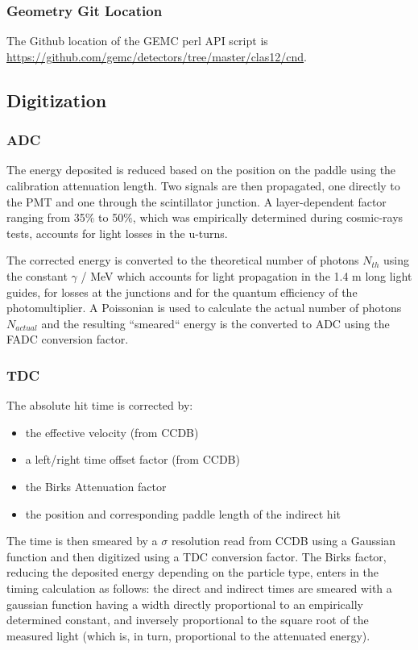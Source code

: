 \subsubsection{Geometry Git Location}
The Github location of the GEMC perl API script is \url{https://github.com/gemc/detectors/tree/master/clas12/cnd}.


\subsection{Digitization}

\subsubsection{ADC}

The energy deposited is reduced based on the position on the paddle using the calibration attenuation length. Two signals are then propagated, one directly
to the PMT and one through the scintillator junction.
A layer-dependent factor ranging from 35$\%$ to 50$\%$, which was empirically
determined during cosmic-rays tests, accounts for light losses in the u-turns.

The corrected energy is converted to the theoretical number of photons $N_{th}$ using the constant $\gamma$ / MeV which accounts for light
propagation in the 1.4 m long light guides, for losses at the junctions and for the quantum efficiency of the photomultiplier.
A Poissonian is used to
calculate the actual number of photons $N_{actual}$ and the resulting ``smeared`` energy is the converted to ADC using the FADC conversion factor.

\subsubsection{TDC}

The absolute hit time is corrected by:

\begin{itemize}
	\item the effective velocity (from CCDB)
	\item a left/right time offset factor (from CCDB)
	\item the Birks Attenuation factor
	\item the position and corresponding paddle length of the indirect hit
\end{itemize}

The time is then smeared by a $\sigma$ resolution read from CCDB using a Gaussian function and then digitized using a TDC conversion factor.
The Birks factor, reducing the deposited
energy depending on the particle type, enters in the timing calculation as
follows: the direct and indirect times are smeared with a gaussian
function having a width directly proportional to an empirically determined
constant, and inversely proportional to the square root of the measured
light (which is, in turn, proportional to the attenuated energy).


